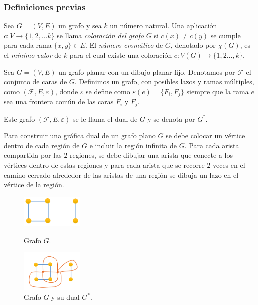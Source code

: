 \documentclass[spanish, utf8,handout]{beamer} %
\theoremstyle{definition}
\begin{document}
\begin{frame}[allowframebreaks]
\frametitle{Definiciones previas}

\begin{definition} 
Sea $G=(V,E)$ un grafo y sea $k$ un número natural. Una aplicación $c\colon V\to \{1,2,\ldots k\}$ se llama \emph{\color{DarkBlue}coloración del grafo} $G$ si $c(x)\neq c(y)$ se cumple para cada rama $\{x,y\}\in E$. \linebreak El \emph{\color{DarkBlue}número cromático} de $G$, denotado por $\chi(G)$, es el \emph{\color{red}mínimo valor} de $k$ para el cual existe una coloración $c\colon V(G)\to\{1,2\ldots,k\}$.
\end{definition}

\begin{definition}
Sea $G=(V,E)$ un grafo planar con un dibujo planar fijo. Denotamos por $\mathcal{F}$ el conjunto de caras de $G$. Definimos un grafo, con posibles lazos y ramas múltiples, como $(\mathcal{F},E,\varepsilon)$, donde $\varepsilon$ se define como $\varepsilon(e)=\{F_i,F_j\}$ siempre que la rama $e$ sea una frontera común de las caras $F_i$ y $F_j$.

Este grafo $\left(\mathcal{F},E,\varepsilon\right)$ se le llama el dual de $G$ y se denota por $G^{\ast}$.	
\end{definition}


\begin{example}
	Para construir una gráfica dual de un grafo plano $G$ se debe colocar un vértice dentro de cada región de $G$ e incluir la región infinita de $G$. Para cada arista compartida por las $2$ regiones, se debe dibujar una arista que conecte a los vértices dentro de estas regiones y para cada arista que se recorre $2$ veces en el camino cerrado alrededor de las aristas de una región se dibuja un lazo en el vértice de la región. 
\end{example}

\begin{figure}[H]
	\captionsetup{justification=centering,margin=0.5cm}
	\centering
	\begin{minipage}{.5\textwidth}
		\centering
		\includegraphics[width=3cm]{example1.png}
		\caption{Grafo $G$.}
	\end{minipage}%
	\begin{minipage}{0.5\textwidth}
		\centering
		\includegraphics[width=3cm]{example2.png}
		\caption{Grafo $G$ y su dual $G^{\ast}$.}
	\end{minipage}
\end{figure}


\end{frame}
\end{document}
